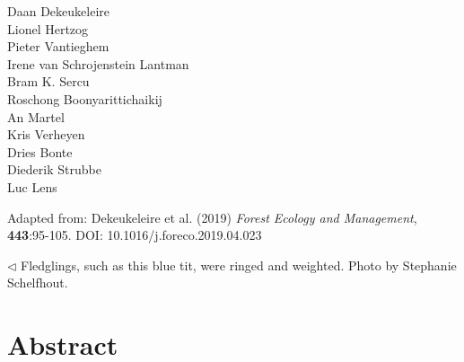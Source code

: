 \documentclass[10pt, twoside]{book} %
\begin{document}
\begin{flushright} \color{gray}Daan Dekeukeleire\\
	Lionel Hertzog\\ Pieter Vantieghem\\ Irene van Schrojenstein Lantman\\ Bram K. Sercu\\
 Roschong Boonyarittichaikij\\ An Martel\\ Kris Verheyen\\ Dries Bonte\\ Diederik Strubbe \\ Luc Lens

\vspace*{1cm}
Adapted from: Dekeukeleire et al. (2019) \textit{Forest Ecology and Management}, \textbf{443}:95-105. DOI: 10.1016/j.foreco.2019.04.023
\end{flushright}

\vspace*{\fill}
\noindent \color{gray} $\lhd$ Fledglings, such as this blue tit, were ringed and weighted. Photo by Stephanie Schelfhout.
	
\color{black}


\newpage

	\section{Abstract}
	
\end{document}
